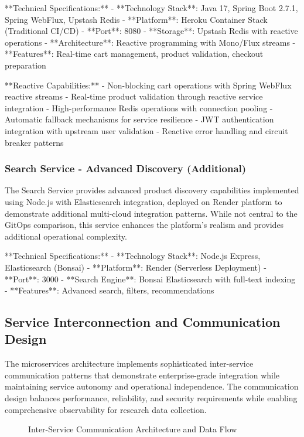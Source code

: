 **Technical Specifications:**
- **Technology Stack**: Java 17, Spring Boot 2.7.1, Spring WebFlux, Upstash Redis
- **Platform**: Heroku Container Stack (Traditional CI/CD)
- **Port**: 8080
- **Storage**: Upstash Redis with reactive operations
- **Architecture**: Reactive programming with Mono/Flux streams
- **Features**: Real-time cart management, product validation, checkout preparation

**Reactive Capabilities:**
- Non-blocking cart operations with Spring WebFlux reactive streams
- Real-time product validation through reactive service integration
- High-performance Redis operations with connection pooling
- Automatic fallback mechanisms for service resilience
- JWT authentication integration with upstream user validation
- Reactive error handling and circuit breaker patterns

\subsubsection{Search Service - Advanced Discovery (Additional)}
The Search Service provides advanced product discovery capabilities implemented using Node.js with Elasticsearch integration, deployed on Render platform to demonstrate additional multi-cloud integration patterns. While not central to the GitOps comparison, this service enhances the platform's realism and provides additional operational complexity.

**Technical Specifications:**
- **Technology Stack**: Node.js Express, Elasticsearch (Bonsai)
- **Platform**: Render (Serverless Deployment)
- **Port**: 3000
- **Search Engine**: Bonsai Elasticsearch with full-text indexing
- **Features**: Advanced search, filters, recommendations

\subsection{Service Interconnection and Communication Design}

The microservices architecture implements sophisticated inter-service communication patterns that demonstrate enterprise-grade integration while maintaining service autonomy and operational independence. The communication design balances performance, reliability, and security requirements while enabling comprehensive observability for research data collection.

\begin{figure}[H]
\centering
\caption{Inter-Service Communication Architecture and Data Flow}
\label{fig:service-communication-patterns}
\end{figure}

